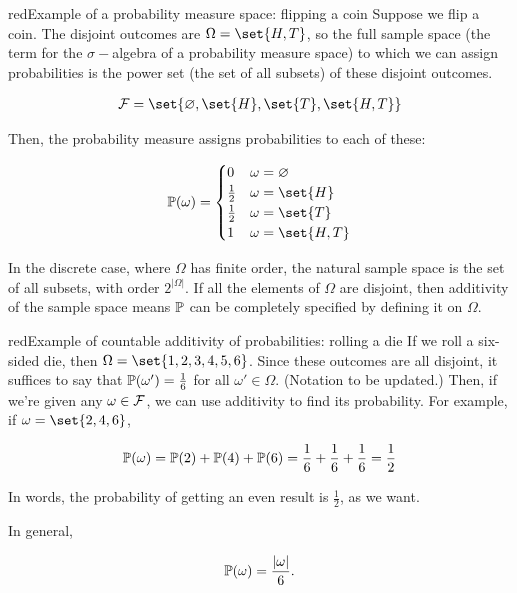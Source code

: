 \documentclass[../analysis.tex]{subfiles}
\begin{document}
    \begin{mycolorbox}{red}{Example of a probability measure space: flipping a coin}
    Suppose we flip a coin. The disjoint outcomes are $\Omega = \set{H, T}$, so the full sample space (the term for the $\sigma-$algebra of a probability measure space) to which we can assign probabilities is the power set (the set of all subsets) of these disjoint outcomes.

    \begin{align*}
        \F = \set{\varnothing, \set{H}, \set{T}, \set{H, T}}
    \end{align*}

    Then, the probability measure assigns probabilities to each of these:

    \begin{align*}
        \P(\omega) = \begin{cases} 0 & \omega = \varnothing \\ \frac{1}{2} & \omega = \set{H} \\ \frac{1}{2} & \omega = \set{T} \\ 1 & \omega = \set{H, T} \end{cases}
    \end{align*}
    \end{mycolorbox}

    In the discrete case, where $\Omega$ has finite order, the natural sample space is the set of all subsets, with order $2^{|\Omega|}$. If all the elements of $\Omega$ are disjoint, then additivity of the sample space means $\P$ can be completely specified by defining it on $\Omega$.

    \begin{mycolorbox}{red}{Example of countable additivity of probabilities: rolling a die}
        If we roll a six-sided die, then $\Omega = \set{1, 2, 3, 4, 5, 6}$. Since these outcomes are all disjoint, it suffices to say that $\P(\omega') = \frac{1}{6}$ for all $\omega' \in \Omega$. (Notation to be updated.) Then, if we're given any $\omega \in \F$, we can use additivity to find its probability. For example, if $\omega = \set{2, 4, 6}$, 

        \begin{align*}
            \P(\omega) = \P(2) + \P(4) + \P(6) = \frac{1}{6} + \frac{1}{6} + \frac{1}{6} = \frac{1}{2}
        \end{align*}

        In words, the probability of getting an even result is $\frac{1}{2}$, as we want. 

        In general, 

        \begin{align*}
            \P(\omega) = \frac{|\omega|}{6}.
        \end{align*}
    \end{mycolorbox}
\end{document}
